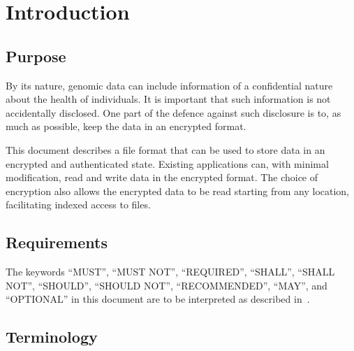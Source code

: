 \section{Introduction}

\subsection{Purpose}
By its nature, genomic data can include information of a confidential nature about the health of individuals.
%
It is important that such information is not accidentally disclosed.
%
One part of the defence against such disclosure is to, as much as possible, keep the data in an encrypted format.
%

This document describes a file format that can be used to store data in an encrypted and authenticated state.
%
Existing applications can, with minimal modification, read and write data in the encrypted format.
%
The choice of encryption also allows the encrypted data to be read starting from any location, facilitating indexed access to files.

\subsection{Requirements}

The keywords ``MUST'', ``MUST NOT'', ``REQUIRED'', ``SHALL'', ``SHALL NOT'', ``SHOULD'', ``SHOULD NOT'', ``RECOMMENDED'', ``MAY'', and ``OPTIONAL'' in this document are to be interpreted as described in~\cite{RFC2119}.

\subsection{Terminology}

